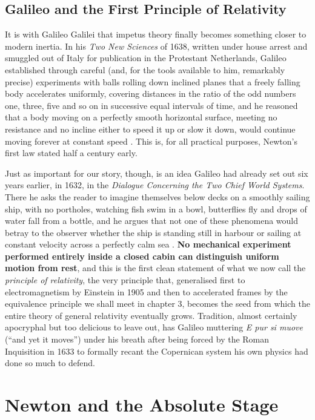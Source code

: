     \subsection{Galileo and the First Principle of Relativity}

    It is with Galileo Galilei that impetus theory finally becomes something closer to modern inertia. In his \textit{Two New Sciences} of 1638, written under house arrest and smuggled out of Italy for publication in the Protestant Netherlands, Galileo established through careful (and, for the tools available to him, remarkably precise) experiments with balls rolling down inclined planes that a freely falling body accelerates uniformly, covering distances in the ratio of the odd numbers one, three, five and so on in successive equal intervals of time, and he reasoned that a body moving on a perfectly smooth horizontal surface, meeting no resistance and no incline either to speed it up or slow it down, would continue moving forever at constant speed \citep{galileo1638}. This is, for all practical purposes, Newton's first law stated half a century early.

    Just as important for our story, though, is an idea Galileo had already set out six years earlier, in 1632, in the \textit{Dialogue Concerning the Two Chief World Systems}. There he asks the reader to imagine themselves below decks on a smoothly sailing ship, with no portholes, watching fish swim in a bowl, butterflies fly and drops of water fall from a bottle, and he argues that not one of these phenomena would betray to the observer whether the ship is standing still in harbour or sailing at constant velocity across a perfectly calm sea \citep{galileo1632}. \textbf{No mechanical experiment performed entirely inside a closed cabin can distinguish uniform motion from rest}, and this is the first clean statement of what we now call the \textit{principle of relativity}, the very principle that, generalised first to electromagnetism by Einstein in 1905 and then to accelerated frames by the equivalence principle we shall meet in chapter 3, becomes the seed from which the entire theory of general relativity eventually grows. Tradition, almost certainly apocryphal but too delicious to leave out, has Galileo muttering \textit{E pur si muove} (``and yet it moves'') under his breath after being forced by the Roman Inquisition in 1633 to formally recant the Copernican system his own physics had done so much to defend.

\section{Newton and the Absolute Stage}


